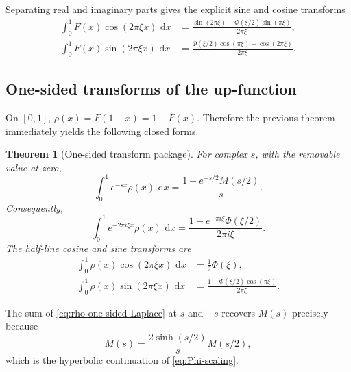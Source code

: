\documentclass[11pt]{article}
\newtheorem{theorem}{Theorem}[section]
\theoremstyle{definition}
\theoremstyle{remark}
\newcommand{\dd}{\,\mathrm d}
\begin{document}
Separating real and imaginary parts gives the explicit sine and cosine transforms
\begin{align}
 \int_0^1F(x)\cos(2\pi\xi x)\,\dd x
 &=\frac{\sin(2\pi\xi)-\Phi(\xi/2)\sin(\pi\xi)}{2\pi\xi},    \label{eq:F-cosine-transform}\\
 \int_0^1F(x)\sin(2\pi\xi x)\,\dd x
 &=\frac{\Phi(\xi/2)\cos(\pi\xi)-\cos(2\pi\xi)}{2\pi\xi}. \label{eq:F-sine-transform}
\end{align}

\subsection{One-sided transforms of the up-function}

On \([0,1]\), \(\rho(x)=F(1-x)=1-F(x)\).  Therefore the previous theorem immediately
yields the following closed forms.

\begin{theorem}[One-sided transform package]\label{thm:one-sided}
For complex \(s\), with the removable value at zero,
\begin{equation}
 \boxed{
 \int_0^1e^{-sx}\rho(x)\,\dd x
 =\frac{1-e^{-s/2}M(s/2)}{s}.
 }                                                           \label{eq:rho-one-sided-Laplace}
\end{equation}
Consequently,
\begin{equation}
 \boxed{
 \int_0^1e^{-2\pi i\xi x}\rho(x)\,\dd x
 =\frac{1-e^{-\pi i\xi}\Phi(\xi/2)}{2\pi i\xi}.
 }                                                           \label{eq:rho-one-sided-Fourier}
\end{equation}
The half-line cosine and sine transforms are
\begin{align}
 \int_0^1\rho(x)\cos(2\pi\xi x)\,\dd x
 &=\frac12\Phi(\xi),                                        \label{eq:rho-half-cos}\\
 \int_0^1\rho(x)\sin(2\pi\xi x)\,\dd x
 &=\frac{1-\Phi(\xi/2)\cos(\pi\xi)}{2\pi\xi}.             \label{eq:rho-half-sin}
\end{align}
\end{theorem}

The sum of \eqref{eq:rho-one-sided-Laplace} at \(s\) and \(-s\) recovers
\(M(s)\) precisely because
\begin{equation}
 M(s)=\frac{2\sinh(s/2)}{s}M(s/2),                           \label{eq:M-scaling}
\end{equation}
which is the hyperbolic continuation of \eqref{eq:Phi-scaling}.
\end{document}
